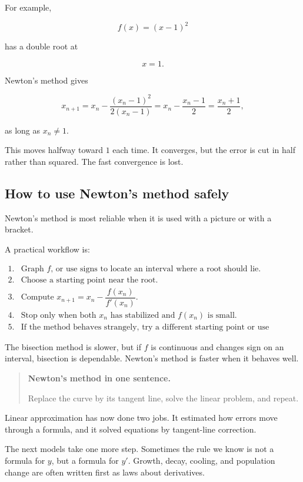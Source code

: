 For example,

\[
f(x)=(x-1)^2
\]

has a double root at

\[
x=1.
\]

Newton's method gives

\[
x_{n+1}
=
x_n-\frac{(x_n-1)^2}{2(x_n-1)}
=
x_n-\frac{x_n-1}{2}
=
\frac{x_n+1}{2},
\]

as long as \(x_n\neq1\).

This moves halfway toward \(1\) each time.  It converges, but the error is cut in
half rather than squared.  The fast convergence is lost.

\subsection{How to use Newton's method safely}
\label{subsec:using-newton-safely}

Newton's method is most reliable when it is used with a picture or with a bracket.

A practical workflow is:

\[
\begin{array}{ll}
\text{1.} & \text{Graph \(f\), or use signs to locate an interval where a root should lie.}\\
\text{2.} & \text{Choose a starting point near the root.}\\
\text{3.} & \text{Compute } x_{n+1}=x_n-\dfrac{f(x_n)}{f'(x_n)}.\\[10pt]
\text{4.} & \text{Stop only when both \(x_n\) has stabilized and \(f(x_n)\) is small.}\\
\text{5.} & \text{If the method behaves strangely, try a different starting point or use bisection.}
\end{array}
\]

The bisection method is slower, but if \(f\) is continuous and changes sign on an
interval, bisection is dependable.  Newton's method is faster when it behaves well.

\begin{quote}
\textbf{Newton's method in one sentence.}

Replace the curve by its tangent line, solve the linear problem, and repeat.
\end{quote}

Linear approximation has now done two jobs.  It estimated how errors move through
a formula, and it solved equations by tangent-line correction.

The next models take one more step.  Sometimes the rule we know is not a formula
for \(y\), but a formula for \(y'\).  Growth, decay, cooling, and population change are
often written first as laws about derivatives.
